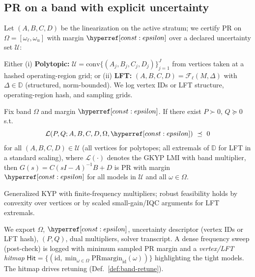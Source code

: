 \subsection*{PR on a band with explicit uncertainty}
Let $(A,B,C,D)$ be the linearization on the active stratum; we certify PR on $\Omega=[\omega_\ell,\omega_u]$ with margin $\constref{epsilon}$ over a declared uncertainty set $\mathcal U$:

\begin{definition}\label{def:unc-set}
\emph{}
Either (i) \textbf{Polytopic:} $\mathcal U=\mathrm{conv}\{(A_j,B_j,C_j,D_j)\}_{j=1}^J$ from vertices taken at a hashed operating-region grid; or (ii) \textbf{LFT:} $(A,B,C,D)=\mathcal F_\ell(M,\Delta)$ with $\Delta\in\mathbb D$ (structured, norm-bounded). We log vertex IDs or LFT structure, operating-region hash, and sampling grids.
\end{definition}

\begin{theorem}\label{thm:gkyp-unc}
\emph{}
Fix band $\Omega$ and margin $\constref{epsilon}$. If there exist $P\succ0$, $Q\succeq0$ s.t.
\[
\mathcal L(P,Q;A,B,C,D,\Omega,\constref{epsilon}) \ \preceq\ 0
\]
for all $(A,B,C,D)\in\mathcal U$ (all vertices for polytopes; all extremals of $\mathbb D$ for LFT in a standard scaling), where $\mathcal L(\cdot)$ denotes the GKYP LMI with band multiplier, then $G(s)=C(sI-A)^{-1}B+D$ is PR with margin $\constref{epsilon}$ for all models in $\mathcal U$ and all $\omega\in\Omega$.
\begin{proofsketch}
Generalized KYP with finite-frequency multipliers; robust feasibility holds by convexity over vertices or by scaled small-gain/IQC arguments for LFT extremals.
\end{proofsketch}
\end{theorem}

\begin{remark}\label{rem:hitmap}
We export $\Omega$, $\constref{epsilon}$, uncertainty descriptor (vertex IDs or LFT hash), $(P,Q)$, dual multipliers, solver transcript. A dense frequency sweep (post-check) is logged with minimum sampled PR margin and a \emph{vertex/LFT hitmap} $\mathsf{Hit}=\{(\text{id}, \min_{\omega\in\Omega}\text{PRmargin}_{\text{id}}(\omega))\}$ highlighting the tight models. The hitmap drives retuning (Def.~\ref{def:band-retune}).
\end{remark}

